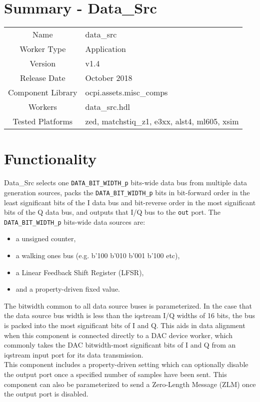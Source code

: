 \documentclass{article}
\author{} %
\date{Version \docVersion} %
\title{\docTitle}
\def\comp{data\_src}
\def\Comp{TEMP}
\def\Comp{Data\_Src }
\begin{document}
\section*{Summary - \Comp}
\begin{tabular}{|c|M{13.5cm}|}
	\hline
	                  &                                                                                \\
	\hline
	Name              & \comp                                                                          \\
	\hline
	Worker Type       & Application                                                                    \\
	\hline
	Version           &  v1.4                                                                         \\
	\hline
	Release Date      & October 2018 \\
	\hline
	Component Library & ocpi.assets.misc\_comps \\
	\hline
	Workers           & \comp.hdl \\
	\hline
	Tested Platforms  & zed, matchstiq\_z1, e3xx, alst4, ml605, xsim \\
	\hline
\end{tabular}

\section*{Functionality}
\begin{flushleft}
\justify
  \Comp selects one \verb+DATA_BIT_WIDTH_p+ bits-wide data bus from multiple data generation sources, packs the \verb+DATA_BIT_WIDTH_p+ bits in bit-forward order in the least significant bits of the I data bus and bit-reverse order in the most significant bits of the Q data bus, and outputs that I/Q bus to the \verb+out+ port. The \verb+DATA_BIT_WIDTH_p+ bits-wide data sources are:
  \begin{itemize}
  \item a unsigned counter,
  \item a walking ones bus (e.g. b'100 \textrightarrow b'010 \textrightarrow b'001 \textrightarrow b'100 \textrightarrow etc),
  \item a Linear Feedback Shift Register (LFSR),
  \item and a property-driven fixed value.
  \end{itemize}
  The bitwidth common to all data source buses is parameterized. In the case that the data source bus width is less than the iqstream I/Q widths of 16 bits, the bus is packed into the most significant bits of I and Q. This aids in data alignment when this component is connected directly to a DAC device worker, which commonly takes the DAC bitwidth-most significant bits of I and Q from an iqstream input port for its data transmission. \\ \medskip
  This component includes a property-driven setting which can optionally disable the output port once a specified number of samples have been sent. This component can also be parameterized to send a Zero-Length Message (ZLM) once the output port is disabled.
\end{flushleft}
\end{document}
